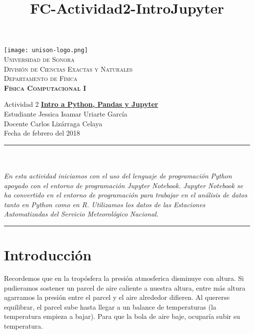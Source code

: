 \documentclass[12pt]{article}
\title{FC-Actividad2-IntroJupyter}
\begin{document}

\begin{center}


\texttt{[image: unison-logo.png]}~\\[0.8cm]

\textsc{\LARGE Universidad de Sonora}\\[0.1cm]
\textsc{Divisi\'on de Ciencias Exactas y Naturales}\\[0.1cm]
\textsc{Departamento de F\'isica \\[0.5cm] \textbf{F\'isica Computacional I}}\\%

\end{center}
\noindent
Actividad 2 \dotfill \textbf{\underline{Intro a Python, Pandas y Jupyter}}\\
Estudiante \dotfill Jessica Isamar Uriarte Garc\'ia \\
Docente \dotfill Carlos Liz\'arraga Celaya \\
Fecha  de febrero del 2018 \\
\rule{\linewidth}{0.5pt} \\[6pt] 
\abstractname{\\ \emph{ \scriptsize{  \baselinestretch En esta actividad iniciamos con el uso del lenguaje de programación Python apoyado con el entorno de programación Jupyter Notebook. Jupyter Notebook se ha convertido en el entorno de programación para trabajar en el análisis de datos tanto en Python como en R. Utilizamos los datos de las Estaciones Automatizadas del Servicio Meteorológico Nacional.\\} }}
\renewcommand{\baselinestretch}{0.6}
\rule{\linewidth}{2pt}  
\small\tableofcontents

\newpage

\section{Introducci\'on}
\noindent 
Recordemos que en la trop\'osfera la presi\'on atmosferica disminuye con altura. Si pudieramos sostener un parcel de aire caliente a nuestra altura, entre m\'as altura agarramos la presi\'on entre el parcel y el aire alrededor difieren. Al quererse equilibrar, el parcel sube hasta llegar a un balance de temperaturas (la temperatura empieza a bajar). Para que la bola de aire baje, ocupar\'ia subir su temperatura. 
\end{document}
